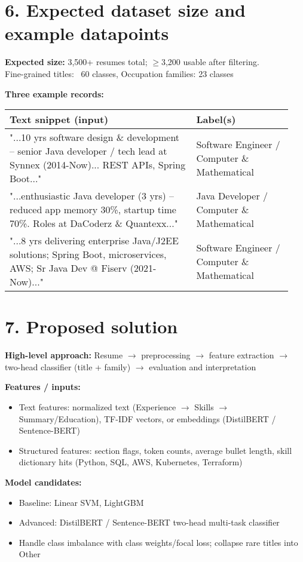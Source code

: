 \documentclass[12pt]{article}
\begin{document}
\section*{6. Expected dataset size and example datapoints}
\textbf{Expected size:} 3,500+ resumes total; $\geq$3,200 usable after filtering. \\
Fine-grained titles: ~60 classes, Occupation families: 23 classes

\textbf{Three example records:} \\[2pt]
\begin{tabular}{p{0.62\linewidth} p{0.32\linewidth}}
\toprule
Text snippet (input) & Label(s) \\
\midrule
"...10 yrs software design \& development -- senior Java developer / tech lead at Synnex (2014-Now)... REST APIs, Spring Boot..." & Software Engineer / Computer \& Mathematical \\
"...enthusiastic Java developer (3 yrs) -- reduced app memory 30\%, startup time 70\%. Roles at DaCoderz \& Quantexx..." & Java Developer / Computer \& Mathematical \\
"...8 yrs delivering enterprise Java/J2EE solutions; Spring Boot, microservices, AWS; Sr Java Dev @ Fiserv (2021-Now)..." & Software Engineer / Computer \& Mathematical \\
\bottomrule
\end{tabular}

\section*{7. Proposed solution}
\textbf{High-level approach:} Resume $\rightarrow$ preprocessing $\rightarrow$ feature extraction $\rightarrow$ two-head classifier (title + family) $\rightarrow$ evaluation and interpretation

\textbf{Features / inputs:}
\begin{itemize}
  \item Text features: normalized text (Experience $\rightarrow$ Skills $\rightarrow$ Summary/Education), TF-IDF vectors, or embeddings (DistilBERT / Sentence-BERT)
  \item Structured features: section flags, token counts, average bullet length, skill dictionary hits (Python, SQL, AWS, Kubernetes, Terraform)
\end{itemize}

\textbf{Model candidates:}
\begin{itemize}
  \item Baseline: Linear SVM, LightGBM
  \item Advanced: DistilBERT / Sentence-BERT two-head multi-task classifier
  \item Handle class imbalance with class weights/focal loss; collapse rare titles into Other
\end{itemize}
\end{document}
